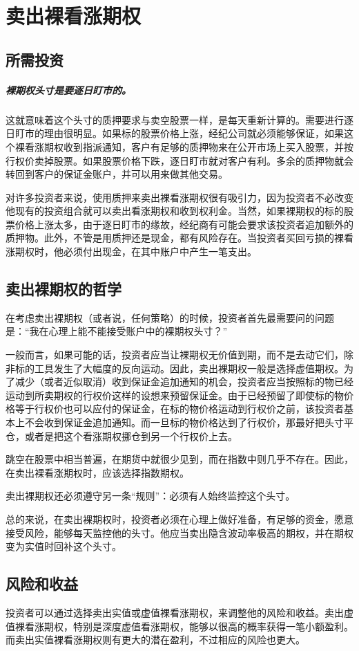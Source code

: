 \chapter{卖出裸看涨期权}
\section{所需投资}
\paragraph{裸期权头寸是要逐日盯市的。}这就意味着这个头寸的质押要求与卖空股票一样，是每天重新计算的。需要进行逐日盯市的理由很明显。如果标的股票价格上涨，经纪公司就必须能够保证，如果这个裸看涨期权收到指派通知，客户有足够的质押物来在公开市场上买入股票，并按行权价卖掉股票。如果股票价格下跌，逐日盯市就对客户有利。多余的质押物就会转回到客户的保证金账户，并可以用来做其他交易。

对许多投资者来说，使用质押来卖出裸看涨期权很有吸引力，因为投资者不必改变他现有的投资组合就可以卖出看涨期权和收到权利金。当然，如果裸期权的标的股票价格上涨太多，由于逐日盯市的缘故，经纪商有可能会要求该投资者追加额外的质押物。此外，不管是用质押还是现金，都有风险存在。当投资者买回亏损的裸看涨期权时，他必须付出现金，在其中账户中产生一笔支出。
\section{卖出裸期权的哲学}
在考虑卖出裸期权（或者说，任何策略）的时候，投资者首先最需要问的问题是：“我在心理上能不能接受账户中的裸期权头寸？”

一般而言，如果可能的话，投资者应当让裸期权无价值到期，而不是去动它们，除非标的工具发生了大幅度的反向运动。因此，卖出裸期权一般是选择虚值期权。为了减少（或者近似取消）收到保证金追加通知的机会，投资者应当按照标的物已经运动到所卖期权的行权价这样的设想来预留保证金。由于已经预留了即使标的物价格等于行权价也可以应付的保证金，在标的物价格运动到行权价之前，该投资者基本上不会收到保证金追加通知。而一旦标的物价格达到了行权价，那最好把头寸平仓，或者是把这个看涨期权挪仓到另一个行权价上去。

跳空在股票中相当普遍，在期货中就很少见到，而在指数中则几乎不存在。因此，在卖出裸看涨期权时，应该选择指数期权。

卖出裸期权还必须遵守另一条“规则”：必须有人始终监控这个头寸。

总的来说，在卖出裸期权时，投资者必须在心理上做好准备，有足够的资金，愿意接受风险，能够每天监控他的头寸。他应当卖出隐含波动率极高的期权，并在期权变为实值时回补这个头寸。
\section{风险和收益}
投资者可以通过选择卖出实值或虚值裸看涨期权，来调整他的风险和收益。卖出虚值裸看涨期权，特别是深度虚值看涨期权，能够以很高的概率获得一笔小额盈利。而卖出实值裸看涨期权则有更大的潜在盈利，不过相应的风险也更大。

